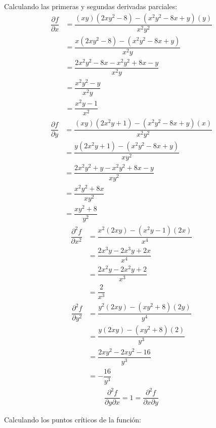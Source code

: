 \documentclass[fleqn, 12pt]{article}
\newcommand{\derivadaparcial}[2]{\dfrac{\partial {#1}}{\partial {#2}}}
\newcommand{\derivadaparcialn}[3]{\dfrac{\partial^{#3} {#1}}{\partial {#2}^{#3}}}
\newcommand{\derivadaparcialnd}[3]{\dfrac{\partial^{2} {#1}}{\partial {#3} \partial {#2}}}
\begin{document}
\begin{enumerate}
\begin{enumerate}
            Calculando las primeras y segundas derivadas parciales:
            \begin{align*}
                \derivadaparcial{f}{x} &= \dfrac{(xy)(2x y^2 - 8) - (x^2 y^2 - 8x + y)(y)}{x^2 y^2} \\
                &= \dfrac{x(2x y^2 - 8) - (x^2 y^2 - 8x + y)}{x^2 y} \\
                &= \dfrac{2x^2 y^2 - 8x - x^2 y^2 + 8x - y}{x^2 y} \\
                &= \dfrac{x^2 y^2 - y}{x^2 y} \\
                &= \dfrac{x^2 y - 1}{x^2}
            \end{align*}
            \begin{align*}
                \derivadaparcial{f}{y} &= \dfrac{(xy)(2x^2 y + 1) - (x^2 y^2 - 8x + y)(x)}{x^2 y^2} \\
                &= \dfrac{y(2x^2 y + 1) - (x^2 y^2 - 8x + y)}{x y^2} \\
                &= \dfrac{2x^2 y^2 + y - x^2 y^2 + 8x - y}{x y^2} \\
                &= \dfrac{x^2 y^2 + 8x}{x y^2} \\
                &= \dfrac{x y^2 + 8}{y^2}
            \end{align*}
            \begin{align*}
                \derivadaparcialn{f}{x}{2} &= \dfrac{x^2(2xy) - (x^2 y - 1)(2x)}{x^4} \\
                &= \dfrac{2x^3 y - 2x^3 y + 2x}{x^4} \\
                &= \dfrac{2x^2 y - 2x^2 y + 2}{x^3} \\
                &= \dfrac{2}{x^3}
            \end{align*}
            \begin{align*}
                \derivadaparcialn{f}{y}{2} &= \dfrac{y^2(2xy) - (x y^2 + 8)(2y)}{y^4} \\
                &= \dfrac{y(2xy) - (x y^2 + 8)(2)}{y^3} \\
                &= \dfrac{2x y^2 - 2x y^2 - 16}{y^3} \\
                &= - \dfrac{16}{y^3}
            \end{align*}
            \begin{align*}
                \derivadaparcialnd{f}{x}{y} = 1 = \derivadaparcialnd{f}{y}{x}
            \end{align*}
           
            Calculando los puntos críticos de la función:


\end{enumerate}
\end{enumerate}
\end{document}
